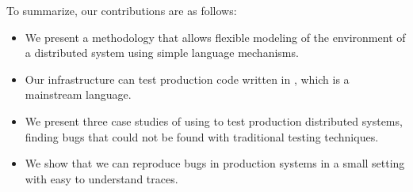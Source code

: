 To summarize, our contributions are as follows:
\begin{itemize}
\item We present a methodology that allows flexible modeling of the environment of a distributed system using simple language mechanisms.
\item Our infrastructure can test production code written in \csharp, which is a mainstream language.
\item We present three case studies of using \psharp to test production distributed systems, finding bugs that could not be found with traditional testing techniques.
\item We show that we can reproduce bugs in production systems in a small setting with easy to understand traces.
\end{itemize}

